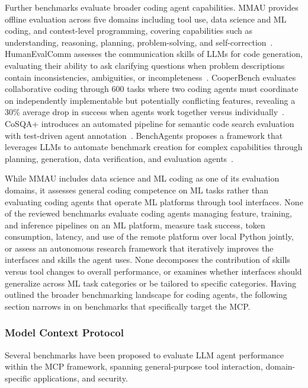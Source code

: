 \documentclass[
english,                 %
bibtex,                  %
includeExtraAbstracts, %
]{kththesis}
\numberwithin{listing}{chapter}
\begin{document}
Further benchmarks evaluate broader coding agent capabilities. \gls{MMAU} provides offline evaluation across five domains including tool use, data science and \gls{ML} coding, and contest-level programming, covering capabilities such as understanding, reasoning, planning, problem-solving, and self-correction~\cite{yin_mmau_2025}. HumanEvalComm assesses the communication skills of \glspl{LLM} for code generation, evaluating their ability to ask clarifying questions when problem descriptions contain inconsistencies, ambiguities, or incompleteness~\cite{wu_humanevalcomm_2025}. CooperBench evaluates collaborative coding through 600 tasks where two coding agents must coordinate on independently implementable but potentially conflicting features, revealing a 30\% average drop in success when agents work together versus individually~\cite{khatua_cooperbench_2026}. \gls{CoSQA}+ introduces an automated pipeline for semantic code search evaluation with test-driven agent annotation~\cite{gong_cosqa_2026}. BenchAgents proposes a framework that leverages \glspl{LLM} to automate benchmark creation for complex capabilities through planning, generation, data verification, and evaluation agents~\cite{butt_benchagents_2025}. 

While \gls{MMAU} includes data science and \gls{ML} coding as one of its evaluation domains, it assesses general coding competence on \gls{ML} tasks rather than evaluating coding agents that operate \gls{ML} platforms through tool interfaces. None of the reviewed benchmarks evaluate coding agents managing feature, training, and inference pipelines on an \gls{ML} platform, measure task success, token consumption, latency, and use of the remote platform over local Python jointly, or assess an autonomous research framework that iteratively improves the interfaces and skills the agent uses. None decomposes the contribution of skills versus tool changes to overall performance, or examines whether interfaces should generalize across \gls{ML} task categories or be tailored to specific categories. Having outlined the broader benchmarking landscape for coding agents, the following section narrows in on benchmarks that specifically target the \gls{MCP}.

\subsubsection{Model Context Protocol}

Several benchmarks have been proposed to evaluate \gls{LLM} agent performance within the \gls{MCP} framework, spanning general-purpose tool interaction, domain-specific applications, and security.
\end{document}
